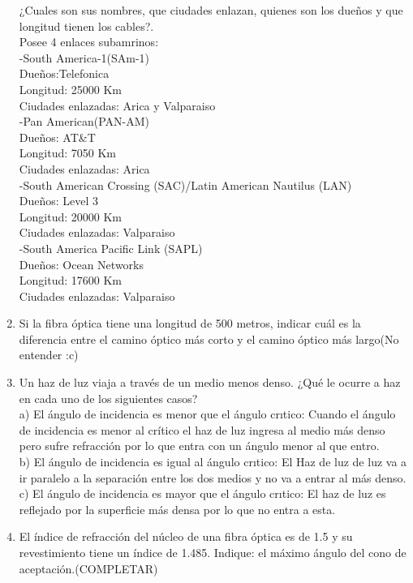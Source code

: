 \documentclass{udparticle}
\begin{document}
\begin{enumerate}
¿Cuales son sus nombres, que ciudades enlazan, quienes son los dueños y que longitud tienen
los cables?.\\
Posee 4 enlaces subamrinos:\\
-South America-1(SAm-1)\\
Dueños:Telefonica\\
Longitud: 25000 Km\\
Ciudades enlazadas: Arica y Valparaiso\\
-Pan American(PAN-AM)\\
Dueños: AT&T\\
Longitud: 7050 Km\\
Ciudades enlazadas: Arica\\
-South American Crossing (SAC)/Latin American Nautilus (LAN)\\
Dueños: Level 3\\
Longitud: 20000 Km\\
Ciudades enlazadas: Valparaiso\\
-South America Pacific Link (SAPL)\\
Dueños: Ocean Networks\\
Longitud: 17600 Km\\
Ciudades enlazadas: Valparaiso\\ 
\item Si la fibra óptica tiene una longitud de 500 metros, indicar cuál es la diferencia entre el camino 
óptico más corto y el camino  óptico más largo(No entender :c)\\
\item  Un haz de luz viaja a través de un medio menos denso. ¿Qué le ocurre a haz en cada uno de los siguientes casos? \\
a) El ángulo de incidencia es menor que el ángulo crıtico: Cuando el ángulo de incidencia es menor al crítico el haz de luz ingresa al medio más denso pero sufre refracción por lo que entra con un ángulo menor al que entro.\\
b) El ángulo de incidencia es igual al ángulo crıtico: El Haz de luz de luz va a ir paralelo a la separación entre los dos medios y no va a entrar al más denso.\\
c) El ángulo de incidencia es mayor que el ángulo crıtico: El haz de luz es reflejado por la superficie más densa por lo que no entra a esta.\\
\item  El índice de refracción del núcleo de una fibra óptica es de 1.5 y su revestimiento tiene un índice de 1.485. Indique: el máximo ángulo del cono de aceptación.(COMPLETAR)\\

\end{enumerate}
\end{document}
